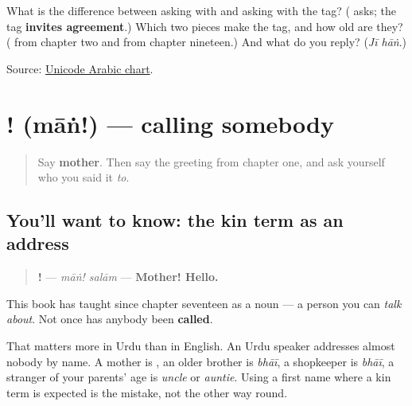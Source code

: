 \begin{tcolorbox}[breakable,colback=teal!4,colframe=teal!35!black,title={Before you move on}]
What is the difference between asking with \textbf{} and asking with the tag? (\textbf{} asks; the tag \textbf{invites agreement}.) Which two pieces make the tag, and how old are they? (\textbf{} from chapter two and \textbf{} from chapter nineteen.) And what do you reply? (\emph{Jī hāṅ}.)

Source: \href{https://www.unicode.org/charts/PDF/U0600.pdf}{Unicode Arabic chart}.
\end{tcolorbox}
\section[\texorpdfstring{\ur{ماں}! (māṅ!)}{ماں! (māṅ!)}]{! (māṅ!) — calling somebody}

\label{lesson:UR-C26-vocative}



\begin{quote}
Say \textbf{mother}. Then say the greeting from chapter one, and ask yourself who you said it \emph{to}.
\end{quote}

\subsection*{You'll want to know: the kin term as an address}
\begin{quote}
\textbf{! } — \emph{māṅ! salām} — \textbf{Mother! Hello.}
\end{quote}

This book has taught \textbf{} since chapter seventeen as a noun — a person you can \emph{talk about}. Not once has anybody been \textbf{called}.

That matters more in Urdu than in English. An Urdu speaker addresses almost nobody by name. A mother is \textbf{}, an older brother is \emph{bhāī}, a shopkeeper is \emph{bhāī}, a stranger of your parents' age is \emph{uncle} or \emph{auntie}. Using a first name where a kin term is expected is the mistake, not the other way round.


